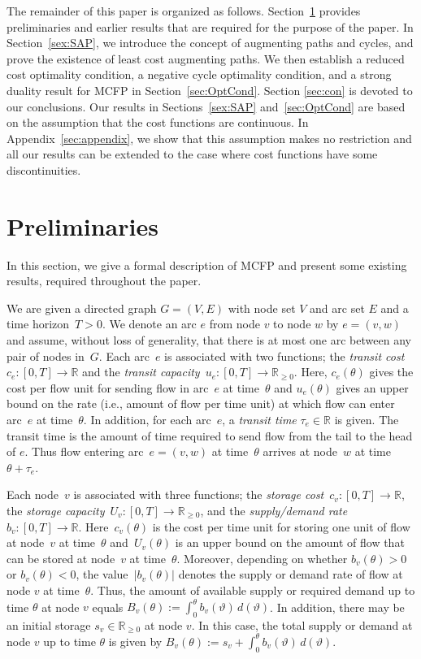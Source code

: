 \documentclass{svjour3}                     \smartqed
\newcommand{\rr}{\ensuremath{\mathbb{R}}}
\begin{document}
The remainder of this paper is organized as follows. Section~\ref{sec:preliminaries} provides preliminaries and earlier results that are required for the purpose of the paper. In Section~\ref{sex:SAP}, we introduce the concept of augmenting paths and cycles, and prove the existence of least cost augmenting paths. We then establish a reduced cost optimality condition, a negative cycle optimality condition, and a strong duality result for \mbox{MCFP} in Section~\ref{sec:OptCond}. Section \ref{sec:con} is devoted to our conclusions. Our results in Sections~\ref{sex:SAP} and~\ref{sec:OptCond} are based on the assumption that the cost functions are continuous. In  Appendix~\ref{sec:appendix}, we show that this assumption makes no restriction and all our results can be extended to the case where cost functions have some discontinuities. 


\section{Preliminaries}
\label{sec:preliminaries}

In this section, we give a formal description of MCFP and present some existing results, required throughout the paper.

We are given a directed graph $G=(V,E)$ with node set $V$ and arc set $E$ and a time horizon~$T>0$. We denote an arc $e$ from node $v$ to node $w$ by $e=(v,w)$ and assume, without loss of generality, that there is at most one arc between any pair of nodes in~$G$. Each arc~$e$ is associated with two functions; the {\em transit cost}~$c_e:[0,T]\to\rr$ and the {\em transit capacity}~$u_e:[0,T]\to\rr_{\geq 0}$. Here, $c_{e}(\theta)$ gives the cost per flow unit for sending flow in arc~$e$ at time~$\theta$ and $u_{e}(\theta)$ gives an upper bound on the rate (i.e., amount of flow per time unit) at which flow can enter arc~$e$ at time~$\theta$. In addition, for each arc~$e$, a {\em transit time} $\tau_{e}\in\rr$ is given. The transit time is the amount of time required to send flow from the tail to the head of $e$. Thus flow entering arc~$e=(v,w)$ at time~$\theta$ arrives at node~$w$ at time~$\theta+\tau_e$.

Each node~$v$ is associated with three functions; the {\em storage cost}~$c_v:[0,T]\to\rr$, the {\em storage capacity}~$U_v:[0,T]\to\rr_{\geq 0}$, and the {\em supply/demand rate}~${b_v:[0,T]\to\rr}$. Here~$c_v(\theta)$ is the cost per time unit for storing one unit of flow at node~$v$ at time~$\theta$ and~$U_v(\theta)$ is an upper bound on the amount of flow that can be stored at node~$v$ at time~$\theta$. Moreover, depending on whether $b_v(\theta)>0$ or $b_v(\theta)<0$, the value~${|b_v(\theta)|}$ denotes the supply or demand rate of flow at node $v$ at time~$\theta$. Thus, the amount of available supply or required demand up to time $\theta$ at node $v$ equals ${B_v(\theta):=\int_{0}^{\theta}b_v(\vartheta)\,d(\vartheta)}$.  In addition, there may be an initial storage $s_v\in\rr_{\geq 0}$ at node $v$. In this case, the total supply or demand at node $v$ up to time $\theta$ is given by $B_v(\theta):=s_v+\int_{0}^{\theta}b_v(\vartheta)\,d(\vartheta)$.
\end{document}
